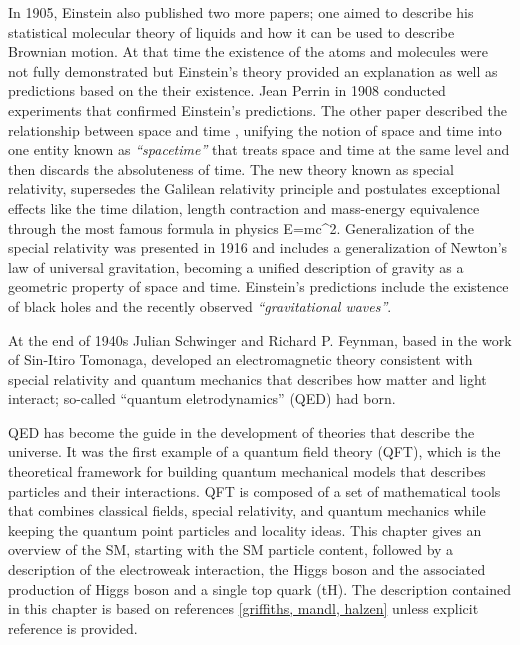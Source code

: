\noindent In 1905, Einstein also published two more papers; one aimed to describe his statistical molecular theory of liquids and how it can be used to describe Brownian motion\cite{brownian}. At that time the existence of the atoms and molecules were not fully demonstrated but Einstein's theory provided an explanation as well as predictions based on the their existence. Jean Perrin in 1908 conducted experiments that confirmed Einstein's predictions. The other paper described the relationship between space and time \cite{relativity}, unifying the notion of space and time into one entity known as \textit{``spacetime''} that treats space and time at the same level and then discards the absoluteness of time. The new theory known as special relativity, supersedes the Galilean relativity principle and postulates exceptional effects like the time dilation, length contraction and mass-energy equivalence through the most famous formula in physics\cite{energy}
\beqn
E=mc^2.
\eeqn
\noindent Generalization of the special relativity was presented in 1916 and includes a generalization of Newton's law of universal gravitation, becoming a unified description of gravity as a geometric property of space and time. Einstein's predictions include the existence of black holes and the recently observed \textit{``gravitational waves''}\cite{ligo}.  

\noindent At the end of 1940s Julian Schwinger\cite{schwinger} and Richard P. Feynman\cite{feynman}, based in the work of Sin-Itiro Tomonaga\cite{tomonaga}, developed an electromagnetic theory consistent with special relativity and quantum mechanics that describes how matter and light interact; so-called ``quantum eletrodynamics'' (QED) had born.%

\noindent QED has become the guide in the development of theories that describe the universe. It was the first example of a quantum field theory (QFT), which is the theoretical framework for building quantum mechanical models that describes particles and their interactions. QFT is composed of a set of mathematical tools that combines classical fields, special relativity, and quantum mechanics while keeping the quantum point particles and locality ideas. This chapter gives an overview of the SM, starting with the SM particle content, followed by a description of the electroweak interaction, the Higgs boson and the associated production of Higgs boson and a single top quark (tH). The description contained in this chapter is based on references \ref{griffiths, mandl, halzen} unless explicit reference is provided.  %

